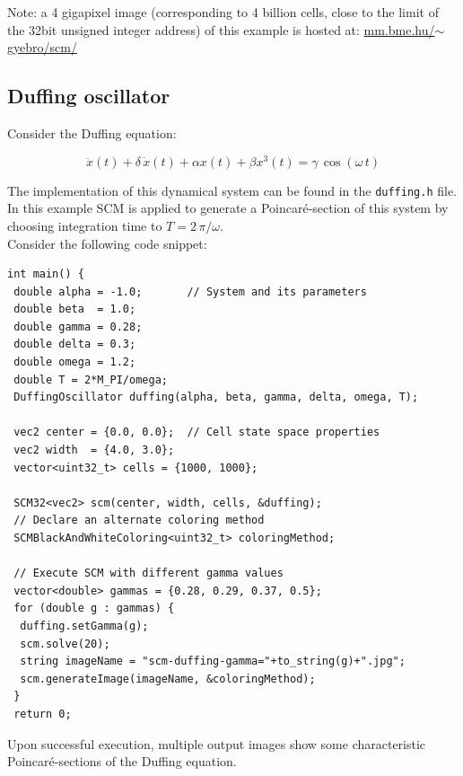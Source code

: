 \documentclass[11pt]{article}
\begin{document}
Note: a 4 gigapixel image (corresponding to 4 billion cells, close to the limit of the 32bit unsigned integer address) of this example is hosted at:  \href{http://www.mm.bme.hu/~gyebro/scm/}{mm.bme.hu/$\sim$gyebro/scm/}


\subsection{Duffing oscillator}

Consider the Duffing equation:

\begin{equation}
\ddot x(t) + \delta\,\dot x(t) + \alpha x(t) + \beta x^3(t) = \gamma\,\cos(\omega\,t)
\end{equation}

The implementation of this dynamical system can be found in the \texttt{duffing.h} file. In this example SCM is applied to generate a Poincaré-section of this system by choosing integration time to $T = 2\,\pi / \omega$. \\
Consider the following code snippet:

\begin{lstlisting}
int main() {
 double alpha = -1.0;       // System and its parameters
 double beta  = 1.0;
 double gamma = 0.28;
 double delta = 0.3;
 double omega = 1.2;
 double T = 2*M_PI/omega;
 DuffingOscillator duffing(alpha, beta, gamma, delta, omega, T);
 
 vec2 center = {0.0, 0.0};  // Cell state space properties
 vec2 width  = {4.0, 3.0};
 vector<uint32_t> cells = {1000, 1000};

 SCM32<vec2> scm(center, width, cells, &duffing);
 // Declare an alternate coloring method
 SCMBlackAndWhiteColoring<uint32_t> coloringMethod;
 
 // Execute SCM with different gamma values
 vector<double> gammas = {0.28, 0.29, 0.37, 0.5};
 for (double g : gammas) {
  duffing.setGamma(g);
  scm.solve(20);
  string imageName = "scm-duffing-gamma="+to_string(g)+".jpg";
  scm.generateImage(imageName, &coloringMethod);
 }
 return 0;
\end{lstlisting}

Upon successful execution, multiple output images show some characteristic Poincaré-sections of the Duffing equation.
\end{document}

